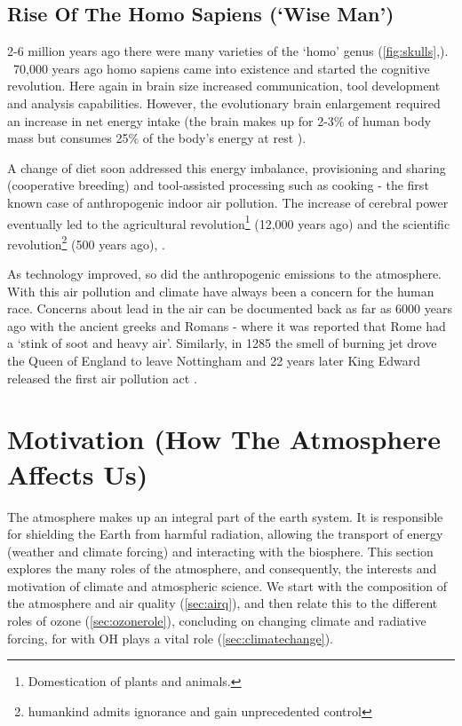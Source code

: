 \subsection{Rise Of The Homo Sapiens (`Wise Man')}
2-6 million years ago there were many varieties of the `homo' genus (\autoref{fig:skulls},\cite{skull}). ~70,000 years ago homo sapiens came into existence and started the cognitive revolution. Here again in brain size increased communication, tool development and analysis capabilities. However, the evolutionary brain enlargement required an increase in net energy intake \citep{brainenergy} (the brain makes up for 2-3\% of human body mass but consumes 25\% of the body's energy at rest \citep{sapiens}).

A change of diet \citep{diet} soon addressed this energy imbalance, provisioning and sharing (cooperative breeding) and tool-assisted processing such as cooking \citep{cooking} - the first known case of anthropogenic indoor air pollution. The increase of cerebral power eventually led to the agricultural revolution\footnote{Domestication of plants and animals.} (12,000 years ago) and the scientific revolution\footnote{ humankind admits ignorance and gain unprecedented control} (500 years ago), \citep{sapiens}.

As technology improved, so did the anthropogenic emissions to the atmosphere. With this air pollution and climate have always been a concern for the human race. Concerns about lead in the air can be documented back as far as 6000 years ago with the ancient greeks \citep{skeptical} and Romans \citep{roman} - where it was reported that Rome had a `stink of soot and heavy air'. Similarly, in 1285 the smell of burning jet drove the Queen of England to leave Nottingham and 22 years later King Edward released the first air pollution act \citep{coal1}.




\section{Motivation (How The Atmosphere Affects Us)}
The atmosphere makes up an integral part of the earth system. It is responsible for shielding the Earth from harmful radiation, allowing the transport of energy (weather and climate forcing) and interacting with the biosphere. This section explores the many roles of the atmosphere, and consequently, the interests and motivation of climate and atmospheric science. We start with the composition of the atmosphere and air quality (\autoref{sec:airq}), and then relate this to the different roles of ozone (\autoref{sec:ozonerole}), concluding on changing climate and radiative forcing, for with OH plays a vital role (\autoref{sec:climatechange}).



